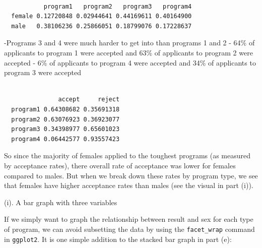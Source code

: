 \documentclass[
]{book}
\newenvironment{Shaded}{\begin{snugshade}}{\end{snugshade}}
\newcommand{\DecValTok}[1]{\textcolor[rgb]{0.00,0.00,0.81}{#1}}
\newcommand{\FunctionTok}[1]{\textcolor[rgb]{0.00,0.00,0.00}{#1}}
\newcommand{\NormalTok}[1]{#1}
\newcommand{\SpecialCharTok}[1]{\textcolor[rgb]{0.00,0.00,0.00}{#1}}
\begin{document}
\begin{Shaded}
\end{Shaded}

\begin{verbatim}
        
           program1   program2   program3   program4
  female 0.12720848 0.02944641 0.44169611 0.40164900
  male   0.38106236 0.25866051 0.18799076 0.17228637
\end{verbatim}

-Programs 3 and 4 were much harder to get into than programs 1 and 2
- 64\% of applicants to program 1 were accepted and 63\% of applicants to program 2 were accepted
- 6\% of applicants to program 4 were accepted and 34\% of applicants to program 3 were accepted

\begin{Shaded}
\end{Shaded}

\begin{verbatim}
          
               accept     reject
  program1 0.64308682 0.35691318
  program2 0.63076923 0.36923077
  program3 0.34398977 0.65601023
  program4 0.06442577 0.93557423
\end{verbatim}

So since the majority of females applied to the toughest programs (as measured by acceptance rates),
there overall rate of acceptance was lower for females compared to males. But when we break down
these rates by program type, we see that females have higher acceptance rates than males (see the
visual in part (i)).

(i). A bar graph with three variables

If we simply want to graph the relationship between result and sex for each type of program, we can avoid subsetting the data by using the \texttt{facet\_wrap} command in \texttt{ggplot2}. It is one simple addition to the stacked bar graph in part (e):
\end{document}
